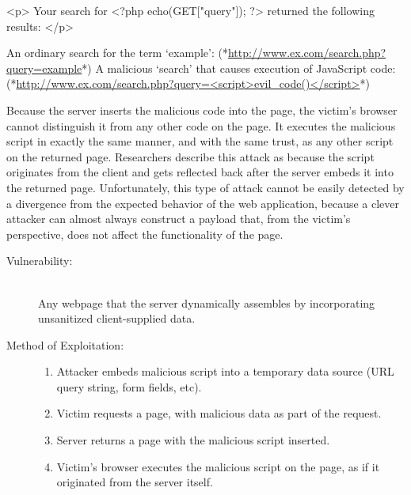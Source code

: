 \begin{jscode}
<p>
    Your search for <?php echo(GET["query"]); ?>
    returned the following results:
</p>
\end{jscode}

\begin{exploit-example}
An ordinary search for the term `example':
(*\url{http://www.ex.com/search.php?query=example}*)
A malicious `search' that causes execution of JavaScript code:
(*\url{http://www.ex.com/search.php?query=<script>evil_code()</script>}*)
\end{exploit-example}

Because the server inserts the malicious code into the page, the victim's browser cannot distinguish it from any other code on the page.
It executes the malicious script in exactly the same manner, and with the same trust, as any other script on the returned page.
Researchers describe this attack as  because the script originates from the client and gets reflected back after the server embeds it into the returned page.
Unfortunately, this type of attack cannot be easily detected by a divergence from the expected behavior of the web application, because a clever attacker can almost always construct a payload that, from the victim's perspective, does not affect the functionality of the page.

\begin{description}
 \item[Vulnerability:] \hfill \\
    Any webpage that the server dynamically assembles by incorporating unsanitized client-supplied data.
 \item[Method of Exploitation:] \hfill
  \begin{enumerate}
   \item Attacker embeds malicious script into a temporary data source (URL query string, form fields, etc).
   \item Victim requests a page, with malicious data as part of the request.
   \item Server returns a page with the malicious script inserted.
   \item Victim's browser executes the malicious script on the page, as if it originated from the server itself.
  \end{enumerate}
\end{description}

